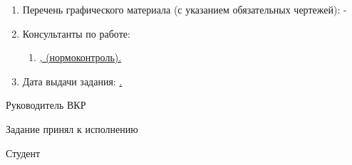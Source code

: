 \begin{enumerate}[1.]
\item Перечень графического материала (с указанием обязательных чертежей): -
\item Консультанты по работе:
\begin{enumerate}[label=\theenumi\arabic*.]
\item \uline{\emakefirstuc{\ConsultantNormDegree}, \ConsultantNorm{} (нормоконтроль).} %
\end{enumerate}
\item Дата выдачи задания: \uline{\thesisStartDate.}
\end{enumerate}

\intervalS%

Руководитель ВКР \uline{\hspace*{0.1\textheight} \Supervisor}







Задание принял к исполнению \uline{\thesisStartDate}


Студент \uline{\hspace*{0.1\textheight}  \Author}



